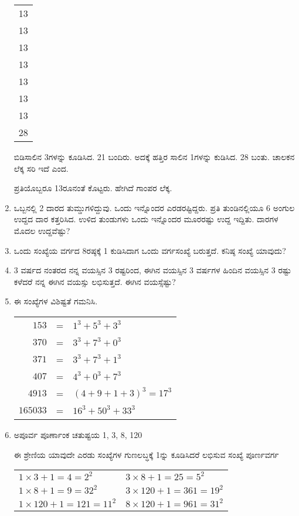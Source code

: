 \begin{enumerate}
\begin{tabular}[t]{c}
13\\
13\\
13\\
13\\
13\\
13\\
13\\
\hline
28\\
\hline
\end{tabular} 

ಬಿಡಿಸಾಲಿನ 3ಗಳನ್ನು ಕೂಡಿಸಿದ. 21 ಬಂದಿರು. ಅದಕ್ಕೆ ಹತ್ತಿರ ಸಾಲಿನ 1ಗಳನ್ನು ಕುಡಿಸಿದ. 28 ಬಂತು. ಚಾಲಕನ ಲೆಕ್ಕ ಸರಿ ಇದೆ ಎಂದ. 

ಪ್ರತಿಯೊಬ್ಬರೂ 13ರೂನಂತೆ ಕೊಟ್ಟರು. ಹೇಗಿದೆ ಗಾಂಪರ ಲೆಕ್ಕ. 

\item ಒಬ್ಬನಲ್ಲಿ 2 ದಾರದ ತುಮ್ಡುಗಳಿದ್ದುವು. ಒಂದು ಇನ್ನೊಂದರ ಎರಡರಷ್ಟಿದ್ದರು. ಪ್ರತಿ ತುಂಡಿನಲ್ಲಿಯೂ 6 ಅಂಗುಲ ಉದ್ದದ ದಾರ ಕತ್ತರಿಸಿದ. ಉಳಿದ ತುಂಡುಗಳು ಒಂದು ಇನ್ನೊಂದರ ಮೂರರಷ್ಟು ಉದ್ದ ಇದ್ದಿತು. ದಾರಗಳ ಮೊದಲ ಉದ್ದವೆಷ್ಟು? 

\item ಒಂದು ಸಂಖ್ಯೆಯ ವರ್ಗದ 8ರಷ್ಠಕ್ಕೆ 1 ಕುಡಿಸಿದಾಗ ಒಂದು ವರ್ಗಸಂಖ್ಯೆ ಬರುತ್ತದೆ. ಕನಿಷ್ಠ ಸಂಖ್ಯೆ ಯಾವುದು? 

\item 3 ವರ್ಷದ ನಂತರದ ನನ್ನ ವಯಸ್ಸಿನ 3 ರಷ್ಟರಿಂದ, ಈಗಿನ ವಯಸ್ಸಿನ 3 ವರ್ಷಗಳ ಹಿಂದಿನ ವಯಸ್ಸಿನ 3 ರಷ್ಟು ಕಳೆದರೆ ನನ್ನ ಈಗಿನ ವಯಸ್ಸು ಲಭಿಸುತ್ತದೆ. ಈಗಿನ ವಯಸ್ಸೆಷ್ಟು? 

\item ಈ ಸಂಖ್ಯೆಗಳ ವಿಶಿಷ್ಟತೆ ಗಮನಿಸಿ. 

\begin{tabular}[t]{rcl}
$153$ & = & $1^{3} + 5^{3} + 3^{3}$\\
$370$ & = & $3^{3} + 7^{3} + 0^{3}$\\
$371$ & = & $3^{3} + 7^{3} + 1^{3}$\\
$407$ & = & $4^{3} + 0^{3} + 7^{3}$\\
$4913$ & = & $(4 + 9 + 1 + 3)^{3} = 17^{3}$\\
$165033$ & = & $16^{3} + 50^{3} + 33^{3}$
\end{tabular}

\item ಅಪೂರ್ವ ಪೂರ್ಣಾಂಕ ಚತುಷ್ಟಯ 1, 3, 8, 120

ಈ ಶ್ರೇಣಿಯ ಯಾವುದೇ ಎರಡು ಸಂಖ್ಯೆಗಳ ಗುಣಲಬ್ಧಕ್ಕೆ 1ನ್ನು ಕೂಡಿಸಿದರೆ ಲಭಿಸುವ ಸಂಖ್ಯೆ ಪೂರ್ಣವರ್ಗ 

\begin{tabular}[t]{ll}
$1 \times 3 + 1 = 4 = 2^{2}$ & $3\times 8 + 1 = 25 = 5^{2}$\\
$1 \times 8 + 1 = 9 =32^{2}$ & $3\times 120 + 1 = 361 = 19^{2}$\\
$1 \times 120 + 1 = 121 = 11^{2}$ & $8\times 120 + 1 = 961 = 31^{2}$\\
\end{tabular}


\end{enumerate}

